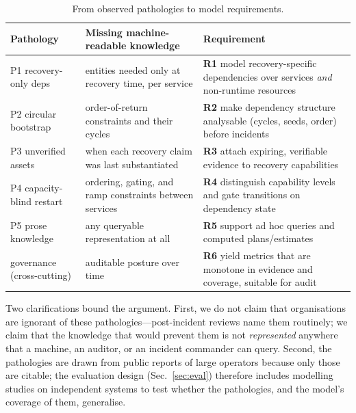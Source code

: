 \begin{table}[t]
\centering\small
\caption{From observed pathologies to model requirements.}
\label{tab:reqs}
\begin{tabularx}{\textwidth}{@{}l X X@{}}
\toprule
\textbf{Pathology} & \textbf{Missing machine-readable knowledge} & \textbf{Requirement} \\
\midrule
P1 recovery-only deps & entities needed only at recovery time, per service & \textbf{R1} model recovery-specific dependencies over services \emph{and} non-runtime resources \\
P2 circular bootstrap & order-of-return constraints and their cycles & \textbf{R2} make dependency structure analysable (cycles, seeds, order) before incidents \\
P3 unverified assets & when each recovery claim was last substantiated & \textbf{R3} attach expiring, verifiable evidence to recovery capabilities \\
P4 capacity-blind restart & ordering, gating, and ramp constraints between services & \textbf{R4} distinguish capability levels and gate transitions on dependency state \\
P5 prose knowledge & any queryable representation at all & \textbf{R5} support ad hoc queries and computed plans/estimates \\
governance (cross-cutting) & auditable posture over time & \textbf{R6} yield metrics that are monotone in evidence and coverage, suitable for audit \\
\bottomrule
\end{tabularx}
\end{table}

Two clarifications bound the argument. First, we do not claim that organisations are ignorant of these pathologies---post-incident reviews name them routinely; we claim that the knowledge that would prevent them is not \emph{represented} anywhere that a machine, an auditor, or an incident commander can query. Second, the pathologies are drawn from public reports of large operators because only those are citable; the evaluation design (Sec.~\ref{sec:eval}) therefore includes modelling studies on independent systems to test whether the pathologies, and the model's coverage of them, generalise.

